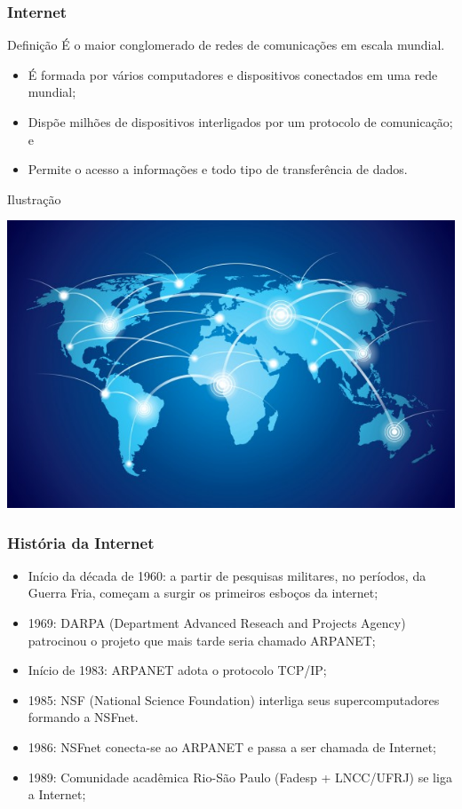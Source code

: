 \documentclass[aspectratio=169]{beamer} %
\begin{document}
\begin{frame}
	\frametitle{Internet}
		
	\begin{block}{Defini\c cão}
		É o maior conglomerado de redes de comunicações em escala mundial.
	\end{block} \vfill
	
	\begin{itemize}
		\item É formada por vários computadores e dispositivos conectados em uma rede mundial;
		\item Dispõe milhões de dispositivos interligados por um protocolo de comunicação; e
		\item Permite o acesso a informações e todo tipo de transferência de dados.
	\end{itemize}\vfill
	
	\begin{exampleblock}{Ilustra\c cão}
		\begin{center}
			\includegraphics[scale=0.2]{img/internet}
		\end{center}
	\end{exampleblock}
\end{frame}

\begin{frame}
	\frametitle{História da Internet}
			
	\begin{itemize}
		\item Início da década de 1960: a partir de pesquisas militares, no períodos, da Guerra Fria, começam a surgir os primeiros esboços da internet;
		\item 1969: DARPA (Department Advanced Reseach and Projects Agency) patrocinou o projeto que mais tarde seria chamado ARPANET;
		\item Início de 1983: ARPANET adota o protocolo TCP/IP;
		\item 1985: NSF (National Science Foundation) interliga seus supercomputadores formando a NSFnet.
		\item 1986: NSFnet conecta-se ao ARPANET e passa a ser chamada de Internet;
		\item 1989: Comunidade acadêmica Rio-São Paulo (Fadesp + LNCC/UFRJ) se liga a Internet;
	\end{itemize}
\end{frame}
\end{document}
